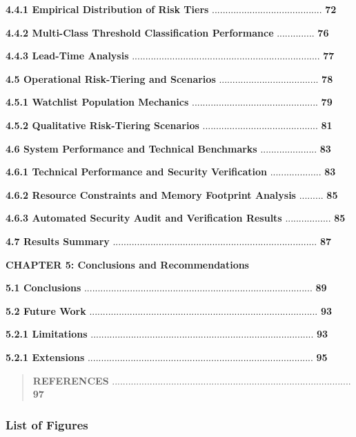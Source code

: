 \documentclass[
]{article}
\begin{document}
\textbf{4.4.1 Empirical Distribution of Risk Tiers}
......................................... \textbf{72}

\textbf{4.4.2 Multi-Class Threshold Classification Performance}
.............. \textbf{76}

\textbf{4.4.3 Lead-Time Analysis}
......................................................................
\textbf{77}

\textbf{4.5 Operational Risk-Tiering and Scenarios}
..................................... \textbf{78}

\textbf{4.5.1 Watchlist Population Mechanics}
............................................... \textbf{79}

\textbf{4.5.2 Qualitative Risk-Tiering Scenarios}
........................................... \textbf{81}

\textbf{4.6 System Performance and Technical Benchmarks}
..................... \textbf{83}

\textbf{4.6.1 Technical Performance and Security Verification}
................... \textbf{83}

\textbf{4.6.2 Resource Constraints and Memory Footprint Analysis}
......... \textbf{85}

\textbf{4.6.3 Automated Security Audit and Verification Results}
................. \textbf{85}

\textbf{4.7 Results Summary}
............................................................................
\textbf{87}

\textbf{CHAPTER 5: Conclusions and Recommendations}

\textbf{5.1 Conclusions}
.....................................................................................
\textbf{89}

\textbf{5.2 Future Work}
.....................................................................................
\textbf{93}

\textbf{5.2.1 Limitations}
...................................................................................
\textbf{93}

\textbf{5.2.1 Extensions}
....................................................................................
\textbf{95}

\begin{quote}
\textbf{REFERENCES}
.........................................................................................
\textbf{97}
\end{quote}

\subsubsection{\texorpdfstring{\textbf{List of
Figures}}{List of Figures}}\label{list-of-figures}
\end{document}

